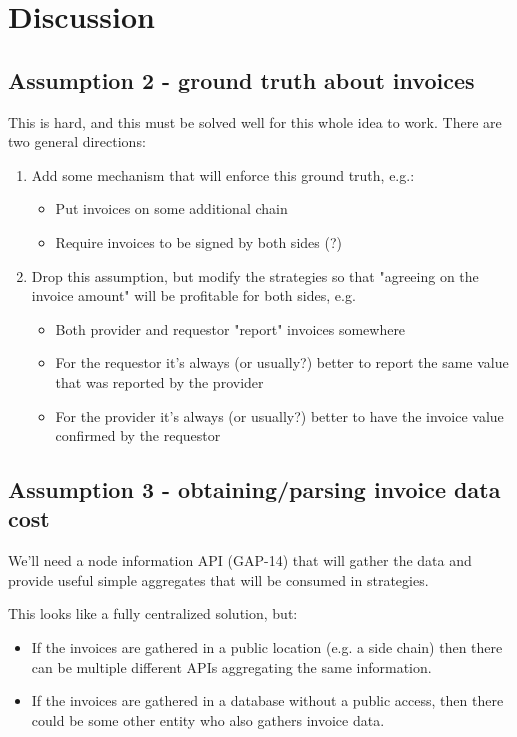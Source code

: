 \documentclass{article}
\begin{document}
\section{Discussion}
\subsection{Assumption 2 - ground truth about invoices}

This is hard, and this must be solved well for this whole idea to work.
There are two general directions:
\begin{enumerate}
    \item Add some mechanism that will enforce this ground truth, e.g.:
        \begin{itemize}
            \item Put invoices on some additional chain
            \item Require invoices to be signed by both sides (?)
        \end{itemize}
    \item Drop this assumption, but modify the strategies so that "agreeing on the invoice amount" will be profitable for both sides, e.g.
        \begin{itemize}
            \item Both provider and requestor "report" invoices somewhere
            \item For the requestor it's always (or usually?) better to report the same value that was reported by the provider
            \item For the provider it's always (or usually?) better to have the invoice value confirmed by the requestor
        \end{itemize}
\end{enumerate}

\subsection{Assumption 3 - obtaining/parsing invoice data cost}

We'll need a node information API (GAP-14) that will gather the data and provide useful simple aggregates that will be consumed in strategies.

This looks like a fully centralized solution, but:
\begin{itemize}
    \item If the invoices are gathered in a public location (e.g. a side chain) then there can be multiple different APIs aggregating the same information.
    \item If the invoices are gathered in a database without a public access, then there could be some other entity who also gathers invoice data.
\end{itemize}
\end{document}
